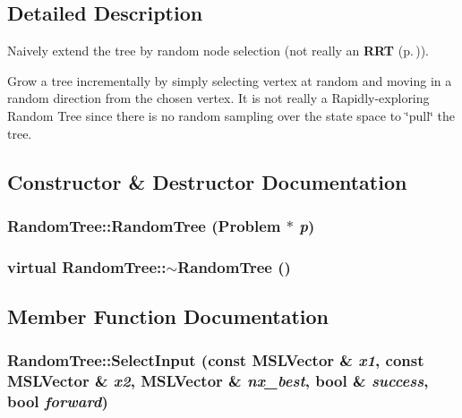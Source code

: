 \subsection{Detailed Description}
Naively extend the tree by random node selection (not really an {\bf RRT} {\rm (p.\,\pageref{classRRT})}).

Grow a tree incrementally by simply selecting vertex at random and  moving in a random direction from the chosen vertex. It is not  really a Rapidly-exploring Random Tree since there is no random sampling over the state space to \char`\"{}pull\char`\"{} the tree. 



\subsection{Constructor \& Destructor Documentation}
\subsubsection{\setlength{\rightskip}{0pt plus 5cm}Random\-Tree::Random\-Tree ({\bf Problem} $\ast$ {\em p})}\label{classRandomTree_a0}


\subsubsection{\setlength{\rightskip}{0pt plus 5cm}virtual Random\-Tree::$\sim$Random\-Tree ()\hspace{0.3cm}{\tt  [inline, virtual]}}\label{classRandomTree_a1}




\subsection{Member Function Documentation}
\subsubsection{ Random\-Tree::Select\-Input (const {\bf MSLVector} \& {\em x1}, const {\bf MSLVector} \& {\em x2}, {\bf MSLVector} \& {\em nx\_\-best}, bool \& {\em success}, bool {\em forward})\hspace{0.3cm}{\tt  [protected, virtual]}}\label{classRandomTree_b1}


